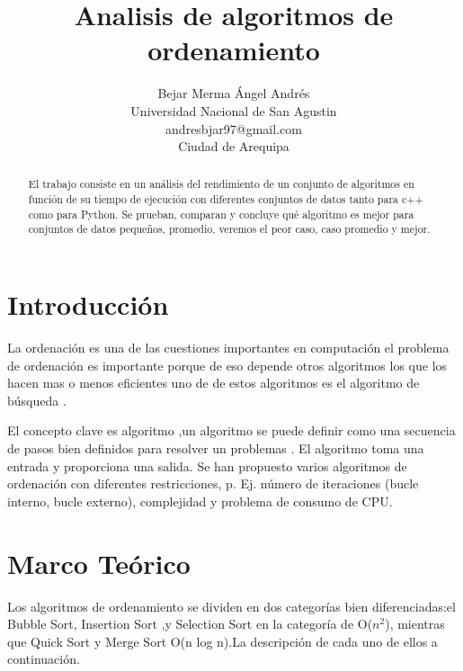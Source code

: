 \documentclass[a4paper]{article}
\title{Analisis de algoritmos de ordenamiento }
\author{Bejar Merma Ángel Andrés\\
  \small Universidad Nacional de San Agustin\\
  \small andresbjar97@gmail.com\\
  \small Ciudad de Arequipa
  \date{}
}
\begin{document}
\maketitle

\begin{abstract}
El trabajo consiste en un análisis del rendimiento de un conjunto de algoritmos en función de su tiempo de ejecución con diferentes conjuntos de datos tanto para c++ como para Python.
Se  prueban, comparan y concluye qué algoritmo es mejor para conjuntos de datos pequeños, promedio, veremos el peor caso, caso promedio y mejor.

\end{abstract}

\section{Introducci\'on}

La ordenación es una de las cuestiones importantes  en computación  el problema de ordenación es importante porque de eso depende otros algoritmos los que los hacen mas o menos eficientes uno de de estos algoritmos es el algoritmo de búsqueda .

El concepto clave  es algoritmo ,un algoritmo se puede definir como una  secuencia de  pasos   bien definidos para resolver un problemas . El algoritmo toma una entrada y proporciona una salida.\cite{5376871}
Se han propuesto varios algoritmos de ordenación con diferentes restricciones, p. Ej. número de iteraciones (bucle interno, bucle externo), complejidad y problema de consumo de CPU.












\section{Marco Teórico}

Los algoritmos de ordenamiento se dividen en dos categorías bien diferenciadas:el Bubble Sort, Insertion Sort ,y Selection Sort en la categoría de O($n^{2}$), mientras que Quick Sort  y Merge Sort  
O(n log n).La descripción de cada uno de ellos a continuación.
\end{document}
